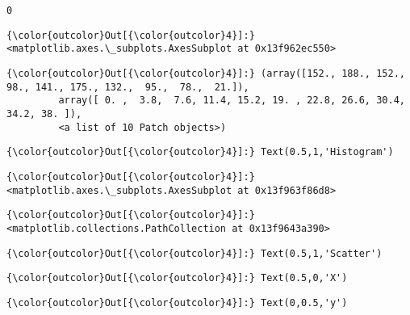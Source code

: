 \documentclass[11pt]{article}
\begin{document}
    \begin{Verbatim}[commandchars=\\\{\}]
0

    \end{Verbatim}

\begin{Verbatim}[commandchars=\\\{\}]
{\color{outcolor}Out[{\color{outcolor}4}]:} <matplotlib.axes.\_subplots.AxesSubplot at 0x13f962ec550>
\end{Verbatim}
            
\begin{Verbatim}[commandchars=\\\{\}]
{\color{outcolor}Out[{\color{outcolor}4}]:} (array([152., 188., 152.,  98., 141., 175., 132.,  95.,  78.,  21.]),
         array([ 0. ,  3.8,  7.6, 11.4, 15.2, 19. , 22.8, 26.6, 30.4, 34.2, 38. ]),
         <a list of 10 Patch objects>)
\end{Verbatim}
            
\begin{Verbatim}[commandchars=\\\{\}]
{\color{outcolor}Out[{\color{outcolor}4}]:} Text(0.5,1,'Histogram')
\end{Verbatim}
            
\begin{Verbatim}[commandchars=\\\{\}]
{\color{outcolor}Out[{\color{outcolor}4}]:} <matplotlib.axes.\_subplots.AxesSubplot at 0x13f963f86d8>
\end{Verbatim}
            
\begin{Verbatim}[commandchars=\\\{\}]
{\color{outcolor}Out[{\color{outcolor}4}]:} <matplotlib.collections.PathCollection at 0x13f9643a390>
\end{Verbatim}
            
\begin{Verbatim}[commandchars=\\\{\}]
{\color{outcolor}Out[{\color{outcolor}4}]:} Text(0.5,1,'Scatter')
\end{Verbatim}
            
\begin{Verbatim}[commandchars=\\\{\}]
{\color{outcolor}Out[{\color{outcolor}4}]:} Text(0.5,0,'X')
\end{Verbatim}
            
\begin{Verbatim}[commandchars=\\\{\}]
{\color{outcolor}Out[{\color{outcolor}4}]:} Text(0,0.5,'y')
\end{Verbatim}
            
\end{document}

